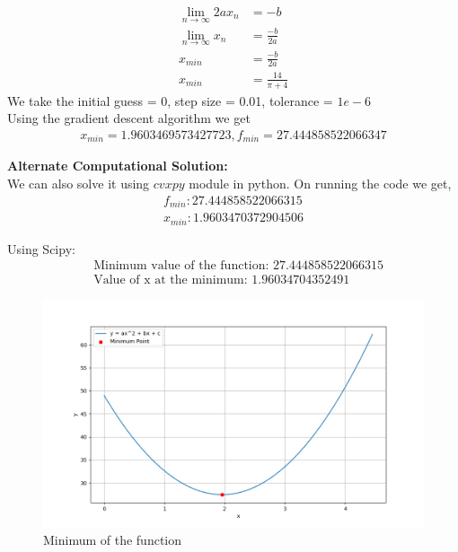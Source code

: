 \documentclass[journal]{IEEEtran}
\numberwithin{equation}{enumi}
\numberwithin{figure}{enumi}
\begin{document}
\begin{itemize}
\begin{align}
        \lim_{n \to \infty}{2ax_n} &= -b\\
        \lim_{n \to \infty}{x_n} &= \frac{-b}{2a}\\
        x_{min} &= \frac{-b}{2a}\\
        x_{min} &= \frac{14}{\pi + 4}
    \end{align}
    We take the initial guess = 0, step size = 0.01, tolerance = $1e - 6$\\
    Using the gradient descent algorithm we get
    \begin{align}
        x_{min} = 1.9603469573427723, f_{min} = 27.444858522066347
    \end{align}\newline\newline
\end{itemize}

\textbf{Alternate Computational Solution: }\\

We can also solve it using $cvxpy$ module in python. On running the code we get,
\begin{align}
    f_{min}: 27.444858522066315\\
    x_{min}: 1.9603470372904506
\end{align}

Using Scipy:\\
\begin{align}
    &\text{Minimum value of the function: }27.444858522066315\\
    &\text{Value of x at the minimum: }1.96034704352491
\end{align}

\begin{figure}[ht]
   \centering
   \includegraphics[width=1\columnwidth]{figs/fig.png}
   \caption{Minimum of the function}
\end{figure}
\end{document}

